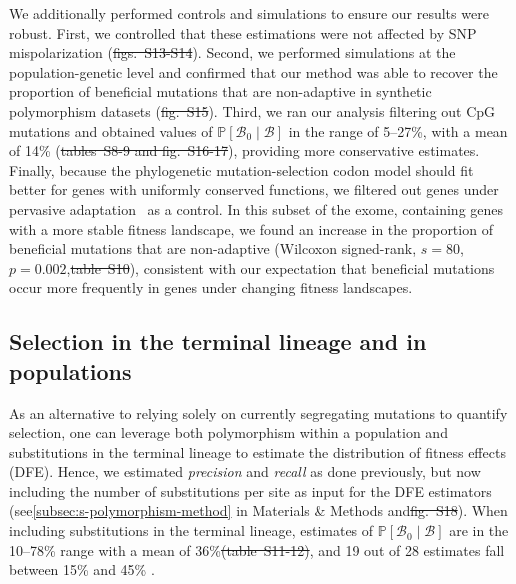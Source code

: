\documentclass[10pt,letterpaper]{article}
\newcommand{\proba}{\mathbb{P}}
\newcommand{\SphyBen}{\mathcal{B}_0}
\newcommand{\given}{\mid}
\newcommand{\SpopBen}{\mathcal{B}}
\providecommand{\DIFaddtex}[1]{{\protect\color{blue}\uwave{#1}}} %
\providecommand{\DIFdeltex}[1]{{\protect\color{red}\sout{#1}}}                      %
\providecommand{\DIFaddbegin}{} %
\providecommand{\DIFaddend}{} %
\providecommand{\DIFdelbegin}{} %
\providecommand{\DIFdelend}{} %
\providecommand{\DIFadd}[1]{\texorpdfstring{\DIFaddtex{#1}}{#1}} %
\providecommand{\DIFdel}[1]{\texorpdfstring{\DIFdeltex{#1}}{}} %
\newcommand{\DIFscaledelfig}{0.5}
\newlength{\DIFdelgraphicswidth} %
\newlength{\DIFdelgraphicsheight} %
\newcommand{\DIFaddincludegraphics}[2][]{{\color{blue}\fbox{\DIFOincludegraphics[#1]{#2}}}} %
\newcommand{\DIFdelincludegraphics}[2][]{%
\sbox{\DIFdelgraphicsbox}{\DIFOincludegraphics[#1]{#2}}%
\settoboxwidth{\DIFdelgraphicswidth}{\DIFdelgraphicsbox} %
\settoboxtotalheight{\DIFdelgraphicsheight}{\DIFdelgraphicsbox} %
\scalebox{\DIFscaledelfig}{%
\parbox[b]{\DIFdelgraphicswidth}{\usebox{\DIFdelgraphicsbox}\\[-\baselineskip] \rule{\DIFdelgraphicswidth}{0em}}\llap{\resizebox{\DIFdelgraphicswidth}{\DIFdelgraphicsheight}{%
\setlength{\unitlength}{\DIFdelgraphicswidth}%
\begin{picture}(1,1)%
\thicklines\linethickness{2pt} %
{\color[rgb]{1,0,0}\put(0,0){\framebox(1,1){}}}%
{\color[rgb]{1,0,0}\put(0,0){\line( 1,1){1}}}%
{\color[rgb]{1,0,0}\put(0,1){\line(1,-1){1}}}%
\end{picture}%
}\hspace*{3pt}}} %
} %
\DeclareRobustCommand{\DIFaddbegin}{\DIFOaddbegin \let\includegraphics\DIFaddincludegraphics} %
\DeclareRobustCommand{\DIFaddend}{\DIFOaddend \let\includegraphics\DIFOincludegraphics} %
\DeclareRobustCommand{\DIFdelbegin}{\DIFOdelbegin \let\includegraphics\DIFdelincludegraphics} %
\DeclareRobustCommand{\DIFdelend}{\DIFOaddend \let\includegraphics\DIFOincludegraphics} %
\begin{document}
We additionally performed controls and simulations to ensure our results were robust.
First, we controlled that these estimations were not affected by SNP mispolarization (\DIFdelbegin \DIFdel{figs.~S13-S14}\DIFdelend \DIFaddbegin {}\DIFadd{,~}\DIFaddend ).
Second, we performed simulations at the population-genetic level and confirmed that our method was able to recover the proportion of beneficial mutations that are non-adaptive in synthetic polymorphism datasets (\DIFdelbegin \DIFdel{fig.~S15}\DIFdelend \DIFaddbegin {}\DIFaddend ).
Third, we ran our analysis filtering out CpG mutations and obtained values of $\proba [ \SphyBen \given \SpopBen]$ in the range of 5--27\%, with a mean of 14\% (\DIFdelbegin \DIFdel{tables~S8-9 and fig.~S16-17}\DIFdelend \DIFaddbegin {}\DIFadd{, }\DIFadd{, }\DIFaddend ), providing more conservative estimates.
Finally, because the phylogenetic mutation-selection codon model should fit better for genes with uniformly conserved functions, we filtered out genes under pervasive adaptation~\cite{latrille_genes_2023} as a control.
In this subset of the exome, containing genes with a more stable fitness landscape, we found an increase in the proportion of beneficial mutations that are non-adaptive (Wilcoxon signed-rank, $s=80$, $p=0.002$,\DIFdelbegin \DIFdel{table~S10}\DIFdelend \DIFaddbegin \DIFadd{~}\DIFaddend ), consistent with our expectation that beneficial mutations occur more frequently in genes under changing fitness landscapes.

\subsection*{Selection in the terminal lineage and in populations}

As an alternative to relying solely on currently segregating mutations to quantify selection, one can leverage both polymorphism within a population and substitutions in the terminal lineage to estimate the distribution of fitness effects (DFE).
Hence, we estimated \textit{precision} and \textit{recall} as done previously, but now including the number of substitutions per site as input for the DFE estimators (see\DIFaddbegin \DIFadd{~}\DIFaddend \ref{subsec:s-polymorphism-method} in Materials \& Methods and\DIFdelbegin \DIFdel{fig.~S18}\DIFdelend \DIFaddbegin \DIFadd{~}\DIFaddend ).
When including substitutions in the terminal lineage, estimates of $\proba [ \SphyBen \given \SpopBen]$ are in the 10--78\% range with a mean of 36\%\DIFdelbegin \DIFdel{(table~S11-12)}\DIFdelend , and 19 out of 28 estimates fall between 15\% and 45\% \DIFaddbegin \DIFadd{(}\DIFadd{, }\DIFadd{)}\DIFaddend .
\end{document}
